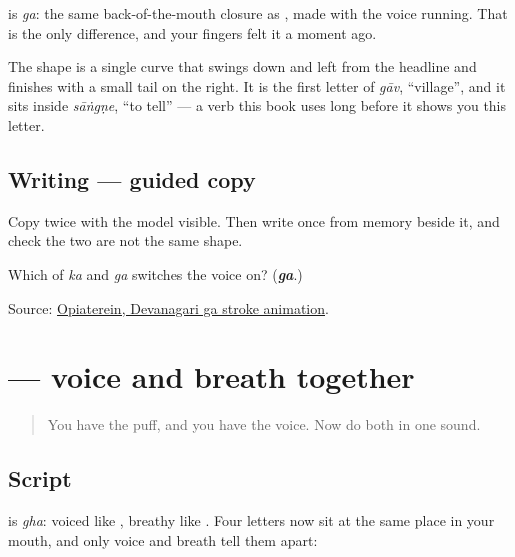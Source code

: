 \textbf{} is \emph{ga}: the same back-of-the-mouth closure as \textbf{}, made with the voice running. That is the only difference, and your fingers felt it a moment ago.

The shape is a single curve that swings down and left from the headline and finishes with a small tail on the right. It is the first letter of \emph{gāv}, \textquotedblleft{}village\textquotedblright{}, and it sits inside \emph{sāṅgṇe}, \textquotedblleft{}to tell\textquotedblright{} — a verb this book uses long before it shows you this letter.

\subsection*{Writing — guided copy}

Copy \textbf{} twice with the model visible. Then write \textbf{} once from memory beside it, and check the two are not the same shape.

\begin{tcolorbox}[breakable,colback=teal!4,colframe=teal!35!black,title={Before you move on}]
Which of \emph{ka} and \emph{ga} switches the voice on? (\emph{\textbf{ga}}.)

Source: \href{https://commons.wikimedia.org/wiki/File:Deva-\%E0\%A4\%97-order.gif}{Opiaterein, Devanagari ga stroke animation}.
\end{tcolorbox}
\section[\texorpdfstring{\mr{घ} (gha)}{घ (gha)}]{ — voice and breath together}

\label{lesson:MR-W06-gha}



\begin{quote}
You have the puff, and you have the voice. Now do both in one sound.
\end{quote}

\subsection*{Script}
\begin{quote}
\end{quote}

\textbf{} is \emph{gha}: voiced like \textbf{}, breathy like \textbf{}. Four letters now sit at the same place in your mouth, and only voice and breath tell them apart:

